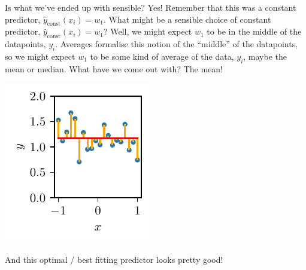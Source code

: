 \documentclass{article}
\newcommand{\dd}[2][]{\frac{\partial #1}{\partial #2}}
\newcommand{\yh}{\hat{y}}
\newcommand{\bracket}[3]{\left#1 #3 \right#2}
\newcommand{\sqb}{\bracket{[}{]}}
\renewcommand{\b}{\bracket{(}{)}}
\renewcommand{\L}{\mathcal{L}}
\begin{document}
Is what we've ended up with sensible?
Yes!
Remember that this was a constant predictor, $\yh_\text{const}(x_i) = w_1$.
What might be a sensible choice of constant predictor, $\yh_\text{const}(x_i) = w_1$?
Well, we might expect $w_1$ to be in the middle of the datapoints, $y_i$.
Averages formalise this notion of the ``middle'' of the datapoints, so we might expect $w_1$ to be some kind of average of the data, $y_i$, maybe the mean or median.
What have we come out with?  The mean!
\begin{center}
  \includegraphics{const_opt.pdf}
\end{center}
And this optimal / best fitting predictor looks pretty good!
\end{document}
